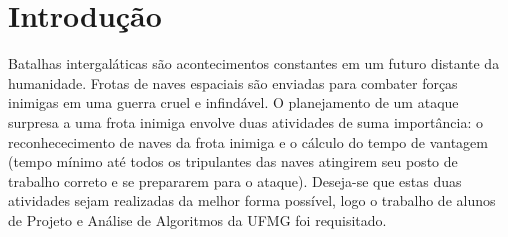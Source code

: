 \section{Introdução} \label{sec:introducao}

Batalhas intergaláticas são acontecimentos constantes em um futuro distante da humanidade. Frotas de naves espaciais são enviadas para combater forças inimigas em uma guerra cruel e infindável. O planejamento de um ataque surpresa a uma frota inimiga envolve duas atividades de suma importância: o reconhececimento de naves da frota inimiga e o cálculo do tempo de vantagem (tempo mínimo até todos os tripulantes das naves atingirem seu posto de trabalho correto e se prepararem para o ataque). Deseja-se que estas duas atividades sejam realizadas da melhor forma possível, logo o trabalho de alunos de Projeto e Análise de Algoritmos da UFMG foi requisitado.



